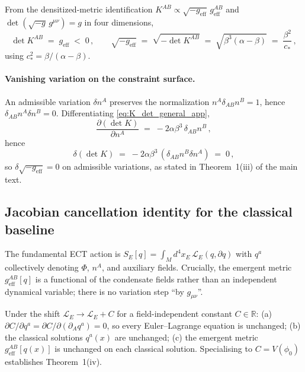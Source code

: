 From the densitized-metric identification $K^{AB} \propto
\sqrt{-g_{\mathrm{eff}}}\,g_{\mathrm{eff}}^{AB}$ and
$\det(\sqrt{-g}\,g^{\mu\nu}) = g$ in four dimensions,
\begin{equation}
\det K^{AB} \;=\; g_{\mathrm{eff}} \;<\; 0\,,
\qquad
\sqrt{-g_{\mathrm{eff}}} \;=\; \sqrt{-\det K^{AB}} \;=\;
\sqrt{\beta^3(\alpha-\beta)} \;=\; \frac{\beta^2}{c_*}\,,
\label{eq:sqrt_g_value_app}
\end{equation}
using $c_*^2 = \beta/(\alpha-\beta)$.

\paragraph{Vanishing variation on the constraint surface.} An
admissible variation $\delta n^A$ preserves the normalization
$n^A\delta_{AB}n^B=1$, hence $\delta_{AB} n^A \delta n^B = 0$. Differentiating
\eqref{eq:K_det_general_app},
\begin{equation}
\frac{\partial(\det K)}{\partial n^A}
\;=\; -2\alpha\beta^3\, \delta_{AB} n^B\,,
\end{equation}
hence
\begin{equation}
\delta(\det K)
\;=\; -2\alpha\beta^3\,(\delta_{AB} n^B \delta n^A) \;=\; 0\,,
\end{equation}
so $\delta\sqrt{-g_{\mathrm{eff}}} = 0$ on admissible variations, as
stated in Theorem~1(iii) of the main text.


\subsection{Jacobian cancellation identity for the classical
baseline}
\label{app:jacobian_cc}

The fundamental ECT action is $S_E[q] = \int_M d^4 x_E\,
\mathcal{L}_E(q,\partial q)$ with $q^a$ collectively denoting
$\Phi$, $n^A$, and auxiliary fields. Crucially, the emergent metric
$g_{\mathrm{eff}}^{AB}[q]$ is a functional of the condensate fields
rather than an independent dynamical variable; there is no variation
step ``by $g_{\mu\nu}$''.

Under the shift $\mathcal{L}_E \to \mathcal{L}_E + C$ for a
field-independent constant $C\in\mathbb{R}$:
(a) $\partial C/\partial q^a = \partial C/\partial(\partial_A q^a)
= 0$, so every Euler--Lagrange equation is unchanged; (b) the
classical solutions $q^a(x)$ are unchanged; (c) the emergent metric
$g_{\mathrm{eff}}^{AB}[q(x)]$ is unchanged on each classical
solution. Specialising to $C = V(\phi_0)$ establishes Theorem~1(iv).

